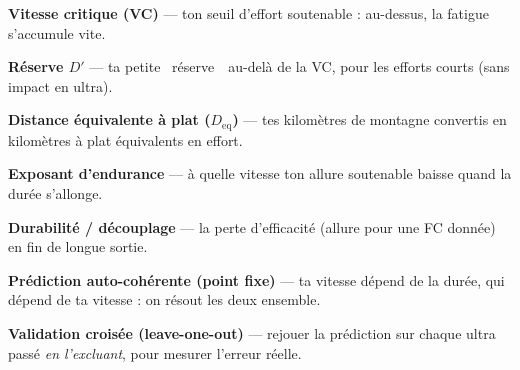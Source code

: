 \documentclass{locomotionreport}
\newcommand{\Deq}{D_{\mathrm{eq}}}
\begin{document}
\begin{llnote}
\textbf{Vitesse critique (VC)} --- ton seuil d'effort soutenable : au-dessus, la fatigue s'accumule vite.\par
\textbf{R\'eserve $D'$} --- ta petite \og~r\'eserve~\fg\ au-del\`a de la VC, pour les efforts courts (sans impact en ultra).\par
\textbf{Distance \'equivalente \`a plat ($\Deq$)} --- tes kilom\`etres de montagne convertis en kilom\`etres \`a plat \'equivalents en effort.\par
\textbf{Exposant d'endurance} --- \`a quelle vitesse ton allure soutenable baisse quand la dur\'ee s'allonge.\par
\textbf{Durabilit\'e / d\'ecouplage} --- la perte d'efficacit\'e (allure pour une FC donn\'ee) en fin de longue sortie.\par
\textbf{Pr\'ediction auto-coh\'erente (point fixe)} --- ta vitesse d\'epend de la dur\'ee, qui d\'epend de ta vitesse : on r\'esout les deux ensemble.\par
\textbf{Validation crois\'ee (leave-one-out)} --- rejouer la pr\'ediction sur chaque ultra pass\'e \emph{en l'excluant}, pour mesurer l'erreur r\'eelle.\par
\end{llnote}

\printbibliography[heading=bibintoc, title={R\'ef\'erences}]
\end{document}
